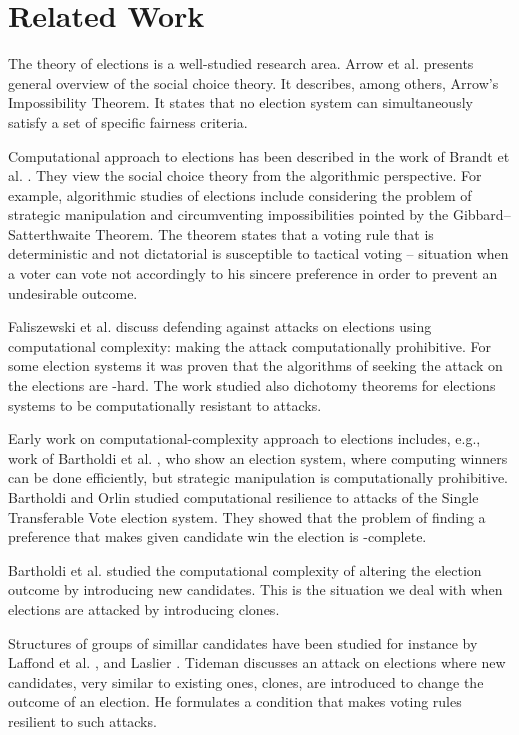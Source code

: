 \section{Related Work}

The theory of elections is a well-studied research area.
Arrow et al. \cite{handbook} presents general overview of the social choice theory.
It describes, among others, Arrow's Impossibility Theorem.
It states that no election system can simultaneously satisfy a set of specific fairness criteria.

Computational approach to elections has been described in the work of
Brandt et al. \cite{compsocialchoice}.
They view the social choice theory from the algorithmic perspective.
For example, algorithmic studies of elections include considering the problem of strategic manipulation
and circumventing impossibilities pointed by the Gibbard–Satterthwaite Theorem.
The theorem states that a voting rule that is deterministic and not dictatorial is susceptible to tactical voting
-- situation when a voter can vote not accordingly to his sincere preference in order to prevent an undesirable outcome.

Faliszewski et al. \cite{usingcomplexity} discuss defending against attacks on elections using computational complexity:
making the attack computationally prohibitive.
For some election systems it was proven that the algorithms of seeking the attack on the elections are \np-hard.
The work studied also dichotomy theorems for elections systems to be computationally resistant to attacks.

Early work on computational-complexity approach to elections includes, e.g.,
work of Bartholdi et al. \cite{usingcomp2}, who show an election system,
where computing winners can be done efficiently, but strategic manipulation is computationally prohibitive.
Bartholdi and Orlin \cite{usingcomp1} studied computational resilience to attacks of the Single Transferable Vote election system.
They showed that the problem of finding a preference that makes given candidate win the election is \np-complete.

Bartholdi et al. \cite{controlbyadding} studied the computational complexity of altering the election
outcome by introducing new candidates.
This is the situation we deal with when elections are attacked by introducing clones.

Structures of groups of simillar candidates have been studied for instance by
Laffond et al. \cite{clones1}, and Laslier \cite{clones2, clones3}.
Tideman \cite{independenceofclones} discusses an attack on elections where new candidates,
very similar to existing ones, clones, are introduced to change the outcome of an election.
He formulates a condition that makes voting rules resilient to such attacks.

